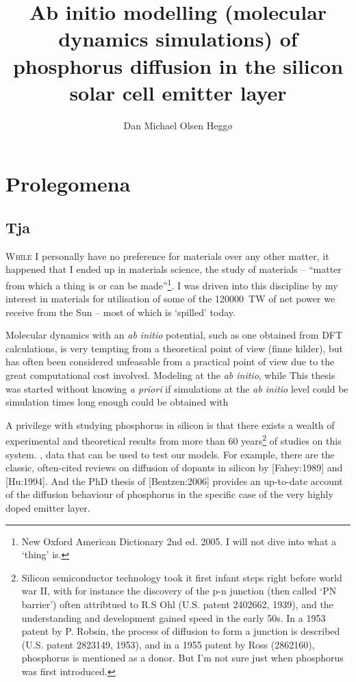 \documentclass[11pt,bibliography=totoc,index=totoc]{scrbook}   %
\title{Ab initio modelling (molecular dynamics simulations) of phosphorus diffusion in the silicon solar cell emitter layer}
\author{Dan Michael Olsen Heggø}
\begin{document}
\frontmatter
\maketitle

\tableofcontents

\mainmatter

\chapter{Prolegomena}

\section{Tja}

\lettrine[lines=3, findent=.2em, slope=-0.5em, nindent=0pt]{W}{hile}
I personally have no preference for materials over any other matter,
it happened that I ended up in materials science, the study of materials 
-- ``matter from which a thing is or can be made''\footnote{New Oxford American Dictionary 2nd ed. 2005. I will not 
dive into what a `thing' is.}. I was driven into this discipline by my
interest in materials for utilisation of some of the \SI{120000}{\tera\watt}
of net power we receive from the Sun -- most of which is `spilled' today. 

Molecular dynamics with an \textit{ab initio} potential, such as one obtained from DFT calculations, is very tempting from a theoretical point of view (finne kilder), but has often been considered unfeasable from a practical point of view due to the great computational cost involved.
Modeling at the \textit{ab initio}, while 
This thesis was started without knowing \textit{a priori} if simulations at the \textit{ab initio} level could be 
simulation times long enough could be obtained with 


A privilege with studying phosphorus in silicon is that there exists a wealth of experimental and theoretical results from more 
than 60 years\footnote{
  Silicon semiconductor technology took it first infant steps right before world war II, with for instance
  the discovery of the p-n junction (then called `PN barrier') often attribtued to R.S Ohl (U.S. patent 2402662, 1939),
  and the understanding and development gained speed in the early 50s. In a 1953 patent by P. Robsin, the process of 
  diffusion to form a junction is described (U.S. patent 2823149, 1953), and in a 1955 patent by Ross (2862160), 
  phosphorus is mentioned as a donor. But I'm not sure just when phosphorus was first introduced.
} of studies on this system. 
, data that can be used to test our models. 
For example, there are the classic, often-cited reviews on diffusion of dopants in silicon by [Fahey:1989] and [Hu:1994]. And the PhD thesis of [Bentzen:2006] provides an up-to-date account of the diffusion behaviour of phosphorus in the specific case of the very highly doped emitter layer.
\end{document}
